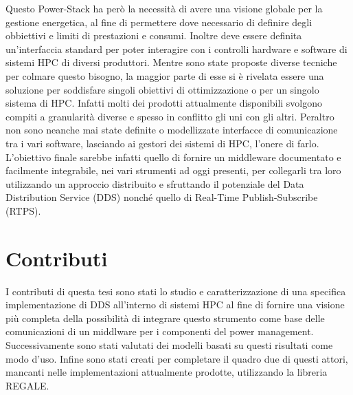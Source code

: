 Questo Power-Stack ha però la necessità di avere una visione globale per la gestione energetica, al fine di permettere dove necessario di definire degli obbiettivi e limiti di prestazioni e consumi. Inoltre deve essere definita un'interfaccia standard per poter interagire con i controlli hardware e software di sistemi HPC di diversi produttori.
Mentre sono state proposte diverse tecniche per colmare questo bisogno, %
la maggior parte di esse si è rivelata essere una soluzione per soddisfare singoli obiettivi di ottimizzazione o per un singolo sistema di HPC. Infatti molti dei prodotti attualmente disponibili svolgono compiti a granularità diverse e spesso in conflitto gli uni con gli altri. Peraltro non sono neanche mai state definite o modellizzate interfacce di comunicazione tra i vari software, lasciando ai gestori dei sistemi di HPC, l'onere di farlo.
L'obiettivo finale sarebbe infatti quello di fornire un middleware documentato e facilmente integrabile, nei vari strumenti ad oggi presenti, per collegarli tra loro utilizzando un approccio distribuito e sfruttando il potenziale del Data Distribution Service (DDS)%
nonché quello di Real-Time Publish-Subscribe (RTPS).


\section{Contributi}
I contributi di questa tesi sono stati lo studio e caratterizzazione di una specifica implementazione di DDS all'interno di sistemi HPC al fine di fornire una visione più completa della possibilità di integrare questo strumento come base delle comunicazioni di un middlware per i componenti del power management. Successivamente sono stati valutati dei modelli basati su questi risultati come modo d'uso. Infine sono stati creati per completare il quadro due di questi attori, mancanti nelle implementazioni attualmente prodotte, utilizzando la libreria REGALE.


